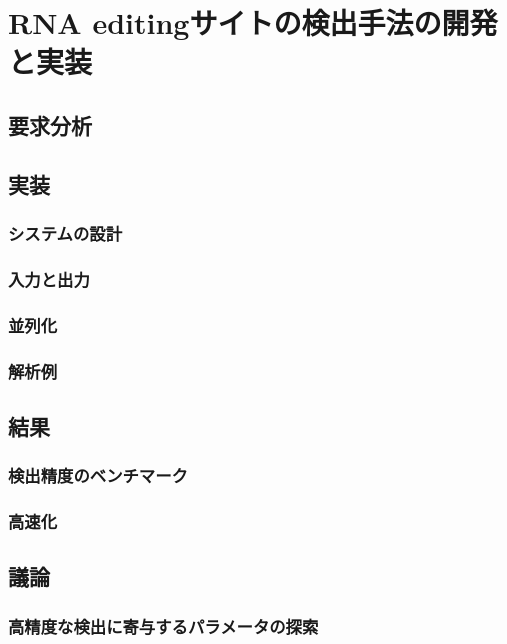 \chapter{RNA editingサイトの検出手法の開発と実装}

\section{要求分析}

\section{実装}
\subsection{システムの設計}
\subsection{入力と出力}
\subsection{並列化}
\subsection{解析例}

\section{結果}
\subsection{検出精度のベンチマーク}
\subsection{高速化}

\section{議論}
\subsection{高精度な検出に寄与するパラメータの探索}